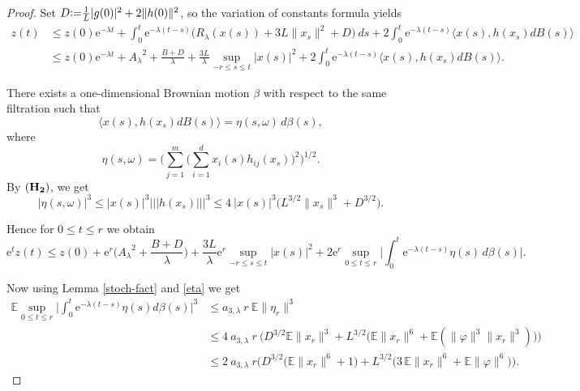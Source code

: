 \documentclass[11pt,reqno,draft]{amsart}
\begin{document}
\begin{proof}
\noindent Set $D{\mathrel{\mathrm{\raise0.1ex\hbox{:}\hbox{=}\strut}}} \frac 1L|g(0)|^2+2\|h(0)\|^2 $, so the
variation of constants formula yields
\begin{equation*}
\begin{split}
z(t)&\leq z(0){\mathrm{e}}^{-\lambda t}+\int_0^t
{\mathrm{e}}^{-\lambda(t-s)}\Big(R_{\lambda}(x(s))+3L\|x_s\|^2+D\Big)\:ds+2\int_0^t{\mathrm{e}}^{-\lambda(t-s)}{\langle}
x(s),h(x_s)dB(s){\rangle}\\
& \leq z(0){\mathrm{e}}^{-\lambda
t}+{A_{\lambda}}^2+\frac{B+D}{\lambda}+\frac{3L}{\lambda}\sup\limits_{-r\leq
s\leq t}|x(s)|^2+2\int_0^t{\mathrm{e}}^{-\lambda(t-s)}{\langle} x(s),h(x_s)dB(s){\rangle}.
\end{split}
\end{equation*}

\noindent There exists a one-dimensional Brownian motion $\beta$ with respect to the same filtration
such that
\begin{equation*}
{\langle} x(s),h(x_s)dB(s){\rangle} = \eta(s,\omega)\,d\beta(s),
\end{equation*}
where
\begin{equation*}
\eta(s,\omega)= \Big(\sum_{j=1}^m \big(\sum_{i=1}^d x_i(s) h_{ij}(x_s)\big)^2\Big)^{1/2}.
\end{equation*}
By ${\bf (H_2)}$, we get
\begin{equation}\label{eta}
|\eta(s,\omega)|^3 \le |x(s)|^3{|\!|\!|{h(x_s)}|\!|\!|}^3 \le 4 \: |x(s)|^3 \big( L^{3/2}\|x_s\|^3 + D^{3/2} \big).
\end{equation}

\noindent Hence for $0 \le t\leq r$ we obtain
\begin{equation*}
{\mathrm{e}}^tz(t)\leq
z(0)+{\mathrm{e}}^r\Big({A_{\lambda}}^2+\frac{B+D}{\lambda}\Big)+\frac{3L}{\lambda}{\mathrm{e}}^r\sup\limits_{-r\leq
s\leq t}|x(s)|^2+2{\mathrm{e}}^{r}\sup\limits_{0\leq t\leq
r}\Big|\int_0^t{\mathrm{e}}^{-\lambda (t-s)} \eta(s)\, d\beta(s)\Big|.
\end{equation*}

\noindent Now using Lemma \ref{stoch-fact} and \eqref{eta} we get
\begin{equation*}
\begin{split}
{\mathbb E}\sup\limits_{0\leq t\leq r}\Big|\int_0^t {\mathrm{e}}^{-\lambda(t-s)}
\eta(s) d\beta(s)\Big|^3&\leq a_{3,\lambda}\: r \: {\mathbb E}\|\eta_r\|^3\\
&\leq 4\:a_{3,\lambda}\: r \: \Big( D^{3/2} {\mathbb E}\|x_r\|^3 + L^{3/2} \big({\mathbb E}\|x_r\|^6 + {\mathbb E}(\|\varphi\|^3\|x_r\|^3)\big)\Big)\\
&\leq 2\:a_{3,\lambda}\: r \Big(D^{3/2} \big({\mathbb E}\|x_r\|^6 + 1\big) +  L^{3/2} \big(3\,{\mathbb E}\|x_r\|^6 + {\mathbb E}\|\varphi\|^6\big)\Big).
\end{split}
\end{equation*}


\end{proof}
\end{document}
